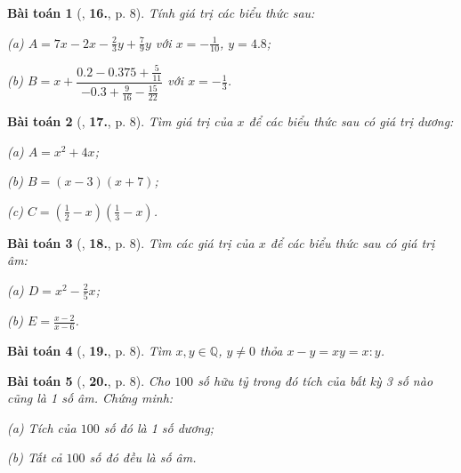 \documentclass{article}
\numberwithin{equation}{section}
\newtheorem{baitoan}{Bài toán}[section]
\begin{document}
\begin{baitoan}[\cite{Tuyen_Toan_7}, \textbf{16.}, p. 8]
	Tính giá trị các biểu thức sau:
	\begin{enumerate*}
		\item[(a)] $A = 7x - 2x - \frac{2}{3}y + \frac{7}{9}y$ với $x = -\frac{1}{10}$, $y = 4.8$;
		\item[(b)] $B = x + \dfrac{0.2 - 0.375 + \frac{5}{11}}{-0.3 + \frac{9}{16} - \frac{15}{22}}$ với $x = -\frac{1}{3}$. 
	\end{enumerate*}
\end{baitoan}

\begin{baitoan}[\cite{Tuyen_Toan_7}, \textbf{17.}, p. 8]
	Tìm giá trị của $x$ để các biểu thức sau có giá trị dương:
	\begin{enumerate*}
		\item[(a)] $A = x^2 + 4x$;
		\item[(b)] $B = (x - 3)(x + 7)$;
		\item[(c)] $C = \left(\frac{1}{2} - x\right)\left(\frac{1}{3} - x\right)$.
	\end{enumerate*}
\end{baitoan}

\begin{baitoan}[\cite{Tuyen_Toan_7}, \textbf{18.}, p. 8]
	Tìm các giá trị của $x$ để các biểu thức sau có giá trị âm:
	\begin{enumerate*}
		\item[(a)] $D = x^2 - \frac{2}{5}x$;
		\item[(b)] $E = \frac{x - 2}{x - 6}$.
	\end{enumerate*}
\end{baitoan}

\begin{baitoan}[\cite{Tuyen_Toan_7}, \textbf{19.}, p. 8]
	Tìm $x,y\in\mathbb{Q}$, $y\ne 0$ thỏa $x - y = xy = x:y$.
\end{baitoan}

\begin{baitoan}[\cite{Tuyen_Toan_7}, \textbf{20.}, p. 8]
	Cho $100$ số hữu tỷ trong đó tích của bất kỳ 3 số nào cũng là 1 số âm. Chứng minh:
	\begin{enumerate*}
		\item[(a)] Tích của $100$ số đó là 1 số dương;
		\item[(b)] Tất cả $100$ số đó đều là số âm.
	\end{enumerate*}
\end{baitoan}
\end{document}
